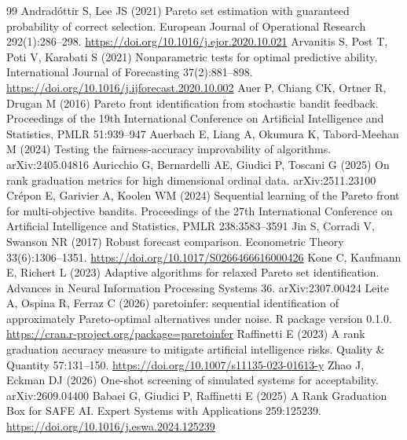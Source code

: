 \documentclass[11pt,a4paper]{article}
\begin{document}

\begin{thebibliography}{99}
\providecommand{\natexlab}[1]{#1}
 Andrad{\'o}ttir S, Lee JS (2021) Pareto set estimation with guaranteed probability of correct selection. European Journal of Operational Research 292(1):286--298. \url{https://doi.org/10.1016/j.ejor.2020.10.021}
 Arvanitis S, Post T, Poti V, Karabati S (2021) Nonparametric tests for optimal predictive ability. International Journal of Forecasting 37(2):881--898. \url{https://doi.org/10.1016/j.ijforecast.2020.10.002}
 Auer P, Chiang CK, Ortner R, Drugan M (2016) Pareto front identification from stochastic bandit feedback. Proceedings of the 19th International Conference on Artificial Intelligence and Statistics, PMLR 51:939--947
 Auerbach E, Liang A, Okumura K, Tabord-Meehan M (2024) Testing the fairness-accuracy improvability of algorithms. arXiv:2405.04816
 Auricchio G, Bernardelli AE, Giudici P, Toscani G (2025) On rank graduation metrics for high dimensional ordinal data. arXiv:2511.23100
 Cr{\'e}pon E, Garivier A, Koolen WM (2024) Sequential learning of the Pareto front for multi-objective bandits. Proceedings of the 27th International Conference on Artificial Intelligence and Statistics, PMLR 238:3583--3591
 Jin S, Corradi V, Swanson NR (2017) Robust forecast comparison. Econometric Theory 33(6):1306--1351. \url{https://doi.org/10.1017/S0266466616000426}
 Kone C, Kaufmann E, Richert L (2023) Adaptive algorithms for relaxed Pareto set identification. Advances in Neural Information Processing Systems 36. arXiv:2307.00424
 Leite A, Ospina R, Ferraz C (2026) paretoinfer: sequential identification of approximately Pareto-optimal alternatives under noise. R package version 0.1.0. \url{https://cran.r-project.org/package=paretoinfer}
 Raffinetti E (2023) A rank graduation accuracy measure to mitigate artificial intelligence risks. Quality \& Quantity 57:131--150. \url{https://doi.org/10.1007/s11135-023-01613-y}
 Zhao J, Eckman DJ (2026) One-shot screening of simulated systems for acceptability. arXiv:2609.04400
 Babaei G, Giudici P, Raffinetti E (2025) A Rank Graduation Box for SAFE AI. Expert Systems with Applications 259:125239. \url{https://doi.org/10.1016/j.eswa.2024.125239}

\end{thebibliography}
\end{document}
